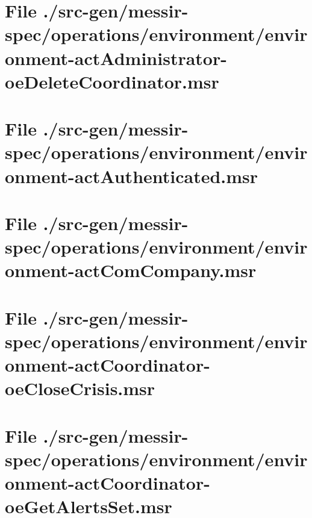 \section[File /src-gen.../environment-actAdministrator-oeDeleteCoordinator.msr]{File ./src-gen/messir-spec/operations/environment/environment-actAdministrator-oeDeleteCoordinator.msr}
\scriptsize

\normalsize
	
\section[File /src-gen/messir-spec/operations.../environment-actAuthenticated.msr]{File ./src-gen/messir-spec/operations/environment/environment-actAuthenticated.msr}
\scriptsize

\normalsize
	
\section[File /src-gen/messir-spec/operations/environment/environment-actComCompany.msr]{File ./src-gen/messir-spec/operations/environment/environment-actComCompany.msr}
\scriptsize

\normalsize
	
\section[File /src-gen/messir-spec.../environment-actCoordinator-oeCloseCrisis.msr]{File ./src-gen/messir-spec/operations/environment/environment-actCoordinator-oeCloseCrisis.msr}
\scriptsize

\normalsize
	
\section[File /src-gen/messir-spec.../environment-actCoordinator-oeGetAlertsSet.msr]{File ./src-gen/messir-spec/operations/environment/environment-actCoordinator-oeGetAlertsSet.msr}
\scriptsize

\normalsize
	
